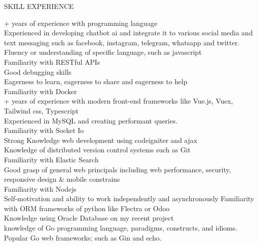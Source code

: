 

\begin{tcolorbox}
    [
    width=\textwidth, 
    colframe=WhiteSmoke,
    colback=LinkedInBlue,
    arc=1mm,
    ]
    \color{WhiteSmoke}
    \centerline{\Large SKILL EXPERIENCE}
\end{tcolorbox}




    {
      + years of experience with programming language \\
      \mybullet Experienced in developing chatbot ai and integrate it to various social media and text messaging such as facebook, instagram, telegram, whatsapp and twitter. \\
      \mybullet Fluency or understanding of specific language, such as javascript \\
      \mybullet Familiarity with RESTful APIs \\
      \mybullet Good debugging skills \\
      \mybullet Eagerness to learn, eagerness to share and eagerness to help \\
      \mybullet Familiarity with Docker \\
      + years of experience with modern front-end frameworks like Vue.js, Vuex, Tailwind css, Typescript \\
      \mybullet Experienced in MySQL and creating performant queries. \\
      \mybullet Familiarity with Socket Io \\
      \mybullet Strong Knowledge web development using codeigniter and ajax \\
      \mybullet Knowledge of distributed version control systems such as Git \\
      \mybullet Familiarity with Elastic Search \\
      \mybullet Good grasp of general web principals including web performance, security, responsive design \& mobile constrains \\
      \mybullet Familiarity with Nodejs \\
      \mybullet Self-motivation and ability to work independently and asynchronously
      \mybullet Familiarity with ORM frameworks of python like Flectra or Odoo \\
      \mybullet Knowledge using Oracle Database on my recent project \\
      \mybullet knowledge of Go programming language, paradigms, constructs, and idioms. \\
      \mybullet Popular Go web frameworks; such as Gin and echo. \\
    }
    

\vspace{0.5in}
